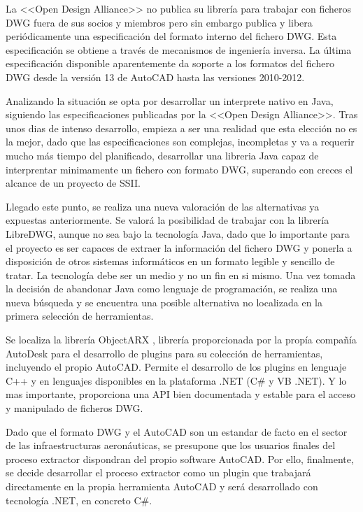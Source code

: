 La <<Open Design Alliance>> no publica su librería para trabajar con ficheros DWG fuera de sus socios y miembros pero sin embargo publica y libera periódicamente una especificación del formato interno del fichero DWG. Esta especificación se obtiene a través de mecanismos de ingeniería inversa. La última especificación disponible aparentemente da soporte a los formatos del fichero DWG desde la versión 13 de AutoCAD hasta las versiones 2010-2012. 

Analizando la situación se opta por desarrollar un interprete nativo en Java, siguiendo las especificaciones publicadas por la <<Open Design Alliance>>. Tras unos dias de intenso desarrollo, empieza a ser una realidad que esta elección no es la mejor, dado que las especificaciones son complejas, incompletas y va a requerir mucho más tiempo del planificado, desarrollar una libreria Java capaz de interprentar minimamente un fichero con formato DWG, superando con creces el alcance de un proyecto de SSII.

Llegado este punto, se realiza una nueva valoración de las alternativas ya expuestas anteriormente. Se valorá la posibilidad de trabajar con la librería LibreDWG, aunque no sea bajo la tecnología Java, dado que lo importante para el proyecto es ser capaces de extraer la información del fichero DWG y ponerla a disposición de otros sistemas informáticos en un formato legible y sencillo de tratar. La tecnología debe ser un medio y no un fin en si mismo. Una vez tomada la decisión de abandonar Java como lenguaje de programación, se realiza una nueva búsqueda y se encuentra una posible alternativa no localizada en la primera selección de herramientas. 

Se localiza la librería ObjectARX \cite{ObjectARX}, librería proporcionada por la propía compañía AutoDesk para el desarrollo de plugins para su colección de herramientas, incluyendo el propio AutoCAD. Permite el desarrollo de los plugins en lenguaje C++ y en lenguajes disponibles en la plataforma .NET (C\# y VB .NET). Y lo mas importante, proporciona una API bien documentada y estable para el acceso y manipulado de ficheros DWG.

Dado que el formato DWG y el AutoCAD son un estandar de facto en el sector de las infraestructuras aeronáuticas, se presupone que los usuarios finales del proceso extractor dispondran del propio software AutoCAD. Por ello, finalmente, se decide desarrollar el proceso extractor como un plugin que trabajará directamente en la propia herramienta AutoCAD y será desarrollado con tecnología .NET, en concreto C\#. 

